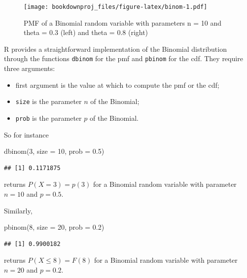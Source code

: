 \documentclass[
]{book}
\newenvironment{Shaded}{\begin{snugshade}}{\end{snugshade}}
\newcommand{\AttributeTok}[1]{\textcolor[rgb]{0.77,0.63,0.00}{#1}}
\newcommand{\DecValTok}[1]{\textcolor[rgb]{0.00,0.00,0.81}{#1}}
\newcommand{\FloatTok}[1]{\textcolor[rgb]{0.00,0.00,0.81}{#1}}
\newcommand{\FunctionTok}[1]{\textcolor[rgb]{0.00,0.00,0.00}{#1}}
\newcommand{\NormalTok}[1]{#1}
\theoremstyle{definition}
\theoremstyle{definition}
\theoremstyle{definition}
\theoremstyle{definition}
\theoremstyle{remark}
\begin{document}
\begin{figure}
\centering
\texttt{[image: bookdownproj\_files/figure-latex/binom-1.pdf]}
\caption{\label{fig:binom}PMF of a Binomial random variable with parameters n = 10 and theta = 0.3 (left) and theta = 0.8 (right)}
\end{figure}

R provides a straightforward implementation of the Binomial distribution through the functions \texttt{dbinom} for the pmf and \texttt{pbinom} for the cdf. They require three arguments:

\begin{itemize}
\item
  first argument is the value at which to compute the pmf or the cdf;
\item
  \texttt{size} is the parameter \(n\) of the Binomial;
\item
  \texttt{prob} is the parameter \(p\) of the Binomial.
\end{itemize}

So for instance

\begin{Shaded}
\begin{Highlighting}[]
\FunctionTok{dbinom}\NormalTok{(}\DecValTok{3}\NormalTok{, }\AttributeTok{size =} \DecValTok{10}\NormalTok{, }\AttributeTok{prob =} \FloatTok{0.5}\NormalTok{)}
\end{Highlighting}
\end{Shaded}

\begin{verbatim}
## [1] 0.1171875
\end{verbatim}

returns \(P(X=3)=p(3)\) for a Binomial random variable with parameter \(n=10\) and \(p = 0.5\).

Similarly,

\begin{Shaded}
\begin{Highlighting}[]
\FunctionTok{pbinom}\NormalTok{(}\DecValTok{8}\NormalTok{, }\AttributeTok{size =} \DecValTok{20}\NormalTok{, }\AttributeTok{prob =} \FloatTok{0.2}\NormalTok{)}
\end{Highlighting}
\end{Shaded}

\begin{verbatim}
## [1] 0.9900182
\end{verbatim}

returns \(P(X\leq 8) = F(8)\) for a Binomial random variable with parameter \(n=20\) and \(p = 0.2\).
\end{document}
